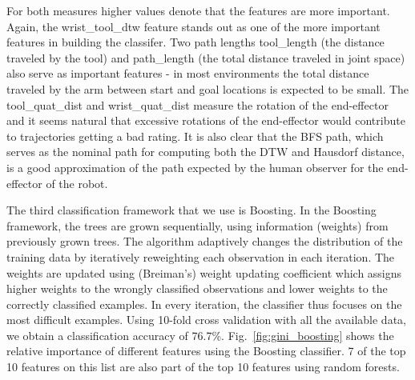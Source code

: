 \documentclass[letterpaper, 10 pt, conference]{ieeeconf}  %
\begin{document}
For both measures higher values denote that the features are more important. Again, the wrist\_tool\_dtw feature stands out as one of the more important features in building the classifer. Two path lengths tool\_length (the distance traveled by the tool) and path\_length (the total distance traveled in joint space) also serve as important features - in most environments the total distance traveled by the arm between start and goal locations is expected to be small. The tool\_quat\_dist and wrist\_quat\_dist measure the rotation of the end-effector and it seems natural that excessive rotations of the end-effector would contribute to trajectories getting a bad rating. It is also clear that the BFS path, which serves as the nominal path for computing both the DTW and Hausdorf distance, is a good approximation of the path expected by the human observer for the end-effector of the robot. 

The third classification framework that we use is Boosting. In the Boosting  framework, the trees are grown sequentially, using information (weights) from previously grown trees.  The algorithm adaptively changes the distribution of the training data by iteratively reweighting each observation in each iteration.  The weights are updated using (Breiman’s) weight updating coefficient which assigns higher weights to the wrongly classified observations and lower weights to the correctly classified examples. In every iteration, the  classifier thus focuses on the most difficult examples. Using 10-fold cross validation with all the available data, we obtain a classification accuracy of 76.7\%. Fig.~\ref{fig:gini_boosting} shows the relative importance of different features using the Boosting classifier. 7 of the top 10 features on this list are also part of the top 10 features using random forests.  
\end{document}
